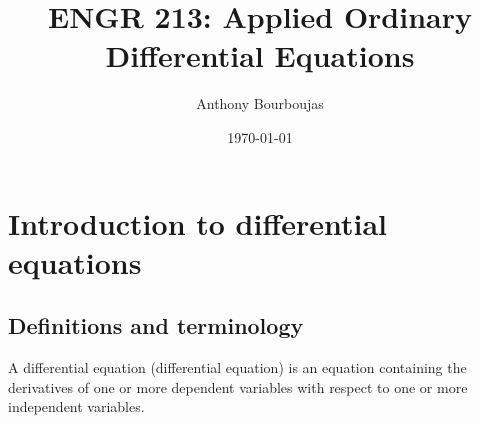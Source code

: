 \documentclass[10pt, twocolumn]{article}
\title{ENGR 213: Applied Ordinary Differential Equations}
\date{\today}
\author{Anthony Bourboujas}
\theoremstyle{definition}
\begin{document}
\maketitle
\setlength{\abovedisplayskip}{2pt} %
\setlength{\belowdisplayskip}{2pt} %


\section{Introduction to differential equations}
\subsection{Definitions and terminology}
A differential equation (differential equation) is an equation containing the derivatives of one or more dependent variables with respect to one or more independent variables.
\end{document}
